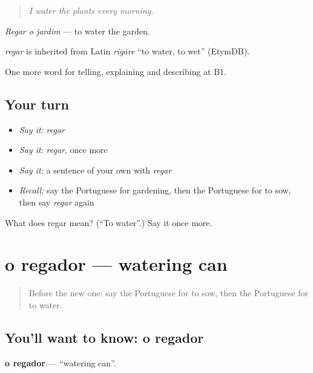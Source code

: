 \begin{quote}
\emph{I water the plants every morning.}
\end{quote}

\emph{Regar o jardim} — to water the garden.

\begin{cousinweb}
\emph{regar} is inherited from Latin \emph{rigāre} \textquotedblleft{}to water, to wet\textquotedblright{} (EtymDB).
\end{cousinweb}

\begin{grammarlens}[title={What you've built}]
One more word for telling, explaining and describing at B1.
\end{grammarlens}

\subsection*{Your turn}
\begin{itemize}
\raggedright
  \item \emph{Say it:} \emph{regar}
  \item \emph{Say it:} \emph{regar}, once more
  \item \emph{Say it:} a sentence of your own with \emph{regar}
  \item \emph{Recall:} say the Portuguese for gardening, then the Portuguese for to sow, then say \emph{regar} again
\end{itemize}

\begin{tcolorbox}[breakable,colback=teal!4,colframe=teal!35!black,title={Before you move on}]
What does regar mean? (\textquotedblleft{}To water\textquotedblright{}.) Say it once more.
\end{tcolorbox}
\section[o regador]{o regador — watering can}

\label{lesson:PT-C501-regador}



\begin{quote}
Before the new one: say the Portuguese for to sow, then the Portuguese for to water.
\end{quote}

\subsection*{You'll want to know: o regador}
\textbf{o regador} — \textquotedblleft{}watering can\textquotedblright{}.

